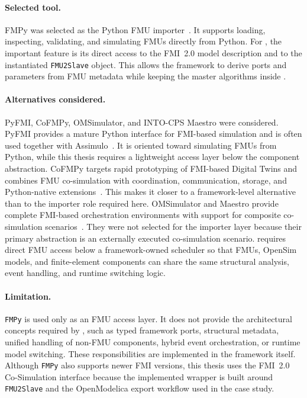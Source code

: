 \paragraph{Selected tool.}
FMPy was selected as the Python \ac{FMU} importer~\cite{dassault_systemes__catia-systems_fmpy_2026}.
It supports loading, inspecting, validating, and simulating \acp{FMU} directly from Python.
For \syssimx{}, the important feature is its direct access to the \ac{FMI}~2.0 model description and to the instantiated \texttt{FMU2Slave} object.
This allows the framework to derive ports and parameters from \ac{FMU} metadata while keeping the master algorithms inside \syssimx{}.

\paragraph{Alternatives considered.}
PyFMI, CoFMPy, OMSimulator, and INTO-CPS Maestro were considered.
PyFMI provides a mature Python interface for \ac{FMI}-based simulation and is often used together with Assimulo~\cite{andersson_pyfmi_2016}.
It is oriented toward simulating \acp{FMU} from Python, while this thesis requires a lightweight access layer below the \syssimx{} component abstraction.
CoFMPy targets rapid prototyping of \ac{FMI}-based Digital Twins and combines \ac{FMU} co-simulation with coordination, communication, storage, and Python-native extensions~\cite{friedrich_cofmpy_2025}.
This makes it closer to a framework-level alternative than to the importer role required here.
OMSimulator and Maestro provide complete \ac{FMI}-based orchestration environments with support for composite co-simulation scenarios~\cite{ochel_omsimulator_2019,thule_maestro_2019}.
They were not selected for the importer layer because their primary abstraction is an externally executed co-simulation scenario.
\syssimx{} requires direct \ac{FMU} access below a framework-owned scheduler so that \acp{FMU}, OpenSim models, and finite-element components can share the same structural analysis, event handling, and runtime switching logic.

\paragraph{Limitation.}
\texttt{FMPy} is used only as an \ac{FMU} access layer.
It does not provide the architectural concepts required by \syssimx{}, such as typed framework ports, structural metadata, unified handling of non-\ac{FMU} components, hybrid event orchestration, or runtime model switching.
These responsibilities are implemented in the framework itself.
Although \texttt{FMPy} also supports newer \ac{FMI} versions, this thesis uses the \ac{FMI}~2.0 Co-Simulation interface because the implemented wrapper is built around \texttt{FMU2Slave} and the OpenModelica export workflow used in the case study.

